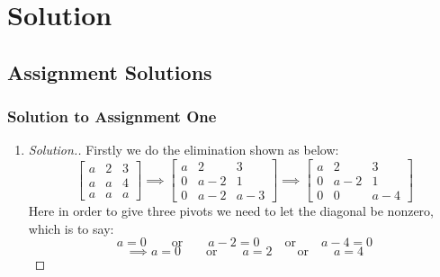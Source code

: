 \chapter{Solution}

\section{Assignment Solutions}
\subsection{Solution to Assignment One}
\begin{enumerate}
\item 
\begin{proof}[Solution.]
Firstly we do the elimination shown as below:
\[\begin{bmatrix}
a & 2 & 3 \\ a & a & 4 \\ a & a & a
\end{bmatrix}\implies\begin{bmatrix}
a & 2 & 3 \\ 0 & a-2 & 1 \\ 0 & a-2 & a-3
\end{bmatrix}\implies
\begin{bmatrix}
a & 2 & 3 \\ 0 & a-2 & 1 \\ 0 & 0 & a-4
\end{bmatrix}\]
Here in order to give three pivots we need to let the diagonal be nonzero, which is to say:
\[
a = 0 \qquad\text{or}\qquad a-2=0 \qquad\text{or}\qquad a-4 = 0
\] 
\[\implies a = 0 \qquad\text{or}\qquad a=2 \qquad\text{or}\qquad a=4\]
\end{proof}





\end{enumerate}
